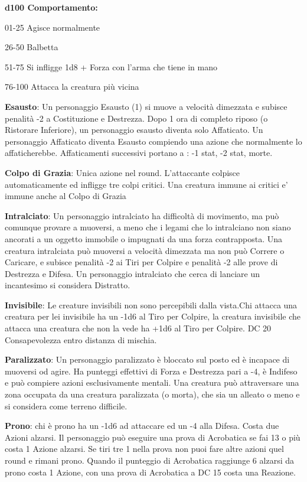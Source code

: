 \documentclass[a4paper,12 pt,openany]{book}
\begin{document}
\begin{textblock*}{19 cm}
\begin{multicols}{2}
\textbf{d100 Comportamento:}

01-25 Agisce normalmente

26-50 Balbetta

51-75 Si infligge 1d8 + Forza con l'arma che tiene in mano

76-100 Attacca la creatura più vicina

\textbf{Esausto}: Un personaggio Esausto (1) si muove a velocità dimezzata e subisce penalità -2 a Costituzione e Destrezza. Dopo 1 ora di completo riposo (o Ristorare Inferiore), un personaggio esausto diventa solo Affaticato. Un personaggio Affaticato diventa Esausto compiendo una azione che normalmente lo affaticherebbe.
Affaticamenti successivi portano a : -1 stat, -2 stat, morte.

\textbf{Colpo di Grazia}: Unica azione nel round. L'attaccante colpisce automaticamente ed infligge tre colpi critici. Una creatura immune ai critici e' immune anche al Colpo di Grazia

\textbf{Intralciato}: Un personaggio intralciato ha difficoltà di movimento, ma può comunque provare a muoversi, a meno che i legami che lo intralciano non siano ancorati a un oggetto immobile o impugnati da una forza contrapposta.
Una creatura intralciata può muoversi a velocità dimezzata ma non può Correre o Caricare, e subisce penalità -2 ai Tiri per Colpire e penalità -2 alle prove di Destrezza e Difesa.
Un personaggio intralciato che cerca di lanciare un incantesimo si considera Distratto.

\textbf{Invisibile}: Le creature invisibili non sono percepibili dalla vista.Chi attacca una creatura per lei invisibile ha un -1d6 al Tiro per Colpire, la creatura invisibile che attacca una creatura che non la vede ha +1d6 al Tiro per Colpire. DC 20 Consapevolezza entro distanza di mischia.

\textbf{Paralizzato}: Un personaggio paralizzato è bloccato sul posto ed è incapace di muoversi od agire. Ha punteggi effettivi di Forza e Destrezza pari a -4, è Indifeso e può compiere azioni esclusivamente mentali.
Una creatura può attraversare una zona occupata da una creatura paralizzata (o morta), che sia un alleato o meno e si considera come terreno difficile.

\textbf{Prono}: chi è prono ha un -1d6 ad attaccare ed un -4 alla Difesa. Costa due Azioni alzarsi. Il personaggio può eseguire una prova di Acrobatica se fai 13 o più costa 1 Azione alzarsi. Se tiri tre 1 nella prova non puoi fare altre azioni quel round e rimani prono. Quando il punteggio di Acrobatica raggiunge 6 alzarsi da prono costa 1 Azione, con una prova di Acrobatica a DC 15 costa una Reazione.


\end{multicols}
\end{textblock*}
\end{document}
